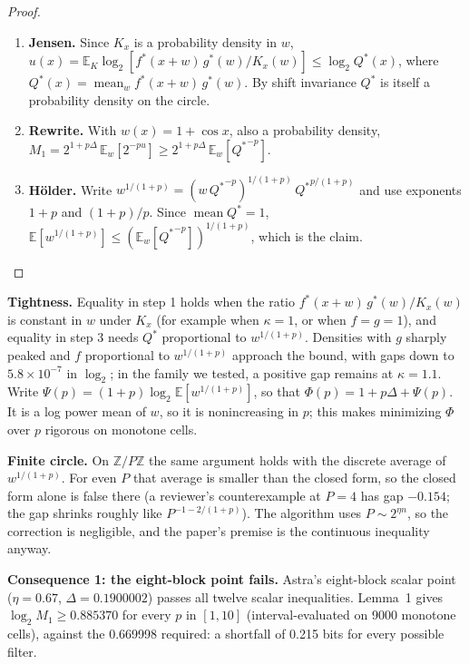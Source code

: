 \documentclass[11pt]{article}
\DeclareMathOperator{\mean}{mean}
\newcommand{\E}{\mathbb{E}}
\theoremstyle{plain}
\begin{document}
\begin{proof}
\leavevmode
\begin{enumerate}
\item \textbf{Jensen.} Since $K_x$ is a probability density in $w$, $u(x) = \E_K \log_2[f^*(x+w)\, g^*(w) / K_x(w)] \le \log_2 Q^*(x)$, where $Q^*(x) = \mean_w f^*(x+w)\, g^*(w)$. By shift invariance $Q^*$ is itself a probability density on the circle.
\item \textbf{Rewrite.} With $w(x) = 1 + \cos x$, also a probability density, $M_1 = 2^{1+p \Delta}\, \E_w[2^{-p u}] \ge 2^{1+p \Delta}\, \E_w[{Q^*}^{-p}]$.
\item \textbf{H\"older.} Write $w^{1/(1+p)} = (w\, {Q^*}^{-p})^{1/(1+p)}\, {Q^*}^{p/(1+p)}$ and use exponents $1+p$ and $(1+p)/p$. Since $\mean Q^* = 1$, $\E[w^{1/(1+p)}] \le (\E_w[{Q^*}^{-p}])^{1/(1+p)}$, which is the claim. \qedhere
\end{enumerate}
\end{proof}

\textbf{Tightness.} Equality in step 1 holds when the ratio $f^*(x+w)\,g^*(w)/K_x(w)$ is constant in $w$ under $K_x$ (for example when $\kappa = 1$, or when $f = g = 1$), and equality in step 3 needs $Q^*$ proportional to $w^{1/(1+p)}$. Densities with $g$ sharply peaked and $f$ proportional to $w^{1/(1+p)}$ approach the bound, with gaps down to $5.8\times10^{-7}$ in $\log_2$; in the family we tested, a positive gap remains at $\kappa = 1.1$. Write $\Psi(p) = (1+p) \log_2 \E[w^{1/(1+p)}]$, so that $\Phi(p) = 1 + p\Delta + \Psi(p)$. It is a log power mean of $w$, so it is nonincreasing in $p$; this makes minimizing $\Phi$ over $p$ rigorous on monotone cells.

\textbf{Finite circle.} On $\mathbb{Z}/P\mathbb{Z}$ the same argument holds with the discrete average of $w^{1/(1+p)}$. For even $P$ that average is smaller than the closed form, so the closed form alone is false there (a reviewer's counterexample at $P = 4$ has gap $-0.154$; the gap shrinks roughly like $P^{-1-2/(1+p)}$). The algorithm uses $P \sim 2^{\eta n}$, so the correction is negligible, and the paper's premise is the continuous inequality anyway.

\textbf{Consequence 1: the eight-block point fails.} Astra's eight-block scalar point ($\eta = 0.67$, $\Delta = 0.1900002$) passes all twelve scalar inequalities. Lemma~1 gives $\log_2 M_1 \ge 0.885370$ for every $p$ in $[1, 10]$ (interval-evaluated on 9000 monotone cells), against the 0.669998 required: a shortfall of 0.215 bits for every possible filter.
\end{document}
